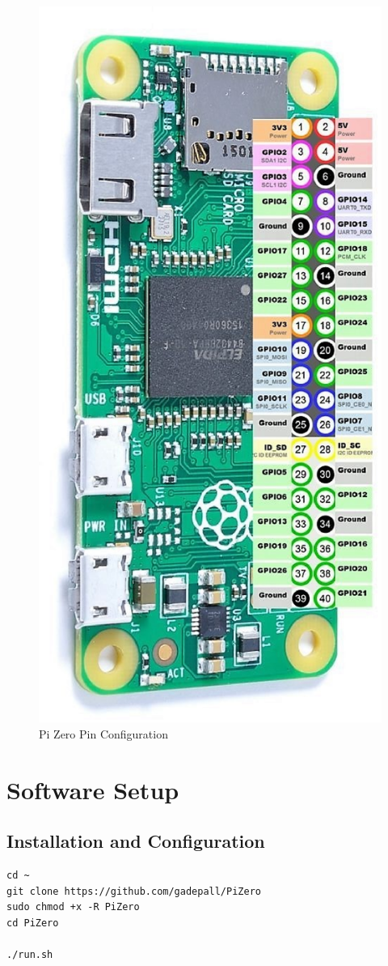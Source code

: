 \documentclass[letterpaper, 10 pt, conference]{ieeeconf}
\begin{document}
\begin{figure}[thpb]
\centering
\includegraphics[width=\columnwidth]{./figs/pizero.eps}
\caption{Pi Zero Pin Configuration}
\label{stm32}
\end{figure}

\section{Software Setup}
\subsection{Installation and Configuration}
\begin{lstlisting}[frame=single, breaklines]
cd ~
git clone https://github.com/gadepall/PiZero
sudo chmod +x -R PiZero
cd PiZero

./run.sh
\end{lstlisting}
\end{document}
